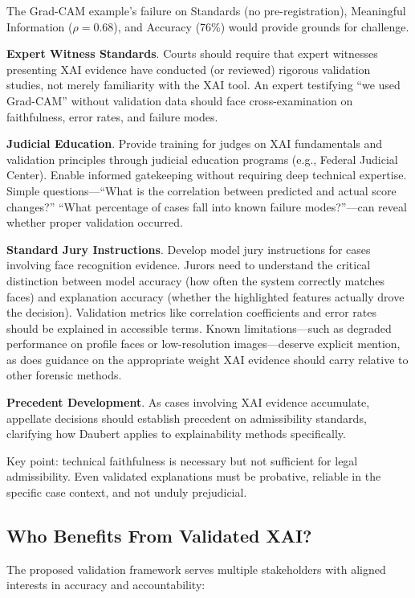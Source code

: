 The Grad-CAM example's failure on Standards (no pre-registration), Meaningful Information ($\rho = 0.68$), and Accuracy (76\%) would provide grounds for challenge.

\textbf{Expert Witness Standards}. Courts should require that expert witnesses presenting XAI evidence have conducted (or reviewed) rigorous validation studies, not merely familiarity with the XAI tool. An expert testifying ``we used Grad-CAM'' without validation data should face cross-examination on faithfulness, error rates, and failure modes.

\textbf{Judicial Education}. Provide training for judges on XAI fundamentals and validation principles through judicial education programs (e.g., Federal Judicial Center). Enable informed gatekeeping without requiring deep technical expertise. Simple questions—``What is the correlation between predicted and actual score changes?'' ``What percentage of cases fall into known failure modes?''—can reveal whether proper validation occurred.

\textbf{Standard Jury Instructions}. Develop model jury instructions for cases involving face recognition evidence. Jurors need to understand the critical distinction between model accuracy (how often the system correctly matches faces) and explanation accuracy (whether the highlighted features actually drove the decision). Validation metrics like correlation coefficients and error rates should be explained in accessible terms. Known limitations—such as degraded performance on profile faces or low-resolution images—deserve explicit mention, as does guidance on the appropriate weight XAI evidence should carry relative to other forensic methods.

\textbf{Precedent Development}. As cases involving XAI evidence accumulate, appellate decisions should establish precedent on admissibility standards, clarifying how Daubert applies to explainability methods specifically.

Key point: technical faithfulness is necessary but not sufficient for legal admissibility. Even validated explanations must be probative, reliable in the specific case context, and not unduly prejudicial.

\subsection{Who Benefits From Validated XAI?}

The proposed validation framework serves multiple stakeholders with aligned interests in accuracy and accountability:

